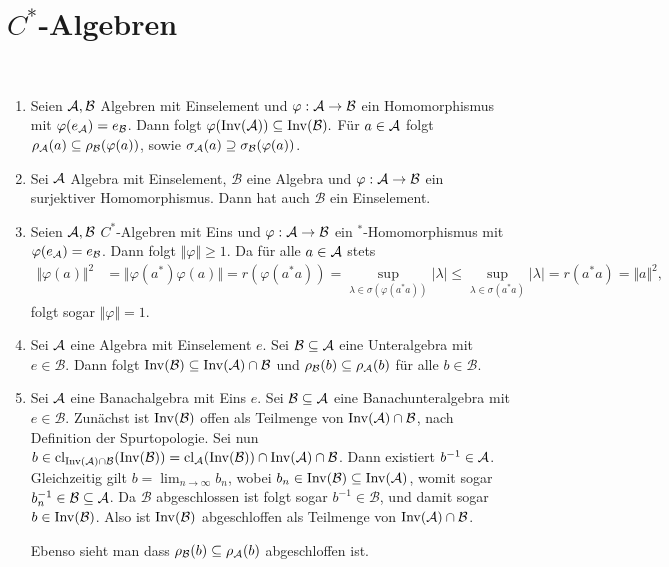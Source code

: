\chapter{\texorpdfstring{$C^*$}{C*}-Algebren}

\begin{remark} \label{rem:eigenschaften-geschachtelter-cstern-algebren} {\ }
    \begin{enumerate}
        \item Seien $\mathcal{A}, \mathcal{B}$ Algebren mit Einselement und $\varphi : \mathcal{A} \to \mathcal{B}$ ein Homomorphismus mit $\varphi(e_{\mathcal{A}}) = e_{\mathcal{B}}$. Dann folgt $\varphi(\operatorname*{Inv}(\mathcal{A})) \subseteq \operatorname*{Inv}(\mathcal{B}).$ Für $a \in \mathcal{A}$ folgt $\rho_{\mathcal{A}}(a) \subseteq \rho_{\mathcal{B}}(\varphi(a))$, sowie $\sigma_{\mathcal{A}}(a) \supseteq \sigma_{\mathcal{B}}(\varphi(a))$.
        
        \item Sei $\mathcal{A}$ Algebra mit Einselement, $\mathcal{B}$ eine Algebra und $\varphi : \mathcal{A} \to \mathcal{B}$ ein surjektiver Homomorphismus. Dann hat auch $\mathcal{B}$ ein Einselement.
        
        \item Seien $\mathcal{A}, \mathcal{B}$ $C^*$-Algebren mit Eins und $\varphi : \mathcal{A} \to \mathcal{B}$ ein ${}^*$-Homo\-morphismus mit $\varphi(e_{\mathcal{A}}) = e_{\mathcal{B}}$. Dann folgt $\Vert \varphi \Vert \geq 1$. Da für alle $a \in \mathcal{A}$ stets
        \begin{align*}
            \Vert \varphi(a) \Vert^2 &= \Vert \varphi(a^*) \varphi(a) \Vert = r(\varphi(a^* a)) = \sup_{\lambda \in \sigma(\varphi(a^* a))} \vert \lambda \vert \leq \sup_{\lambda \in \sigma(a^* a)} \vert \lambda \vert = r(a^* a) = \Vert a \Vert^2,
        \end{align*}
        folgt sogar $\Vert \varphi \Vert = 1$.

        \item Sei $\mathcal{A}$ eine Algebra mit Einselement $e$. Sei $\mathcal{B} \subseteq \mathcal{A}$ eine Unteralgebra mit $e \in \mathcal{B}$. Dann folgt $ \operatorname*{Inv}(\mathcal{B}) \subseteq \operatorname*{Inv}(\mathcal{A}) \cap \mathcal{B} $ und $\rho_{\mathcal{B}}(b) \subseteq \rho_{\mathcal{A}}(b) $ für alle $b \in \mathcal{B}$.
        
        \item Sei $\mathcal{A}$ eine Banachalgebra mit Eins $e$. Sei $\mathcal{B} \subseteq \mathcal{A}$ eine Banachunteralgebra mit $e \in \mathcal{B}$. Zunächst ist $\operatorname*{Inv}(\mathcal{B})$ offen als Teilmenge von $\operatorname*{Inv}(\mathcal{A}) \cap \mathcal{B}$, nach Definition der Spurtopologie. Sei nun $b \in \mathrm{cl}_{\operatorname*{Inv}(\mathcal{A}) \cap \mathcal{B}}(\operatorname*{Inv}(\mathcal{B})) = \mathrm{cl}_{\mathcal{A}}(\operatorname*{Inv}(\mathcal{B})) \cap \operatorname*{Inv}(\mathcal{A}) \cap \mathcal{B}$. Dann existiert $b^{-1} \in \mathcal{A}$. Gleichzeitig gilt $b = \lim_{n \to \infty} b_n$, wobei $b_n \in \operatorname*{Inv}(\mathcal{B}) \subseteq \operatorname*{Inv}(\mathcal{A})$, womit sogar $b_n^{-1} \in \mathcal{B} \subseteq \mathcal{A}$. Da $\mathcal{B}$ abgeschlossen ist folgt sogar $b^{-1} \in \mathcal{B}$, und damit sogar $b \in \operatorname*{Inv}(\mathcal{B})$. Also ist $\operatorname*{Inv}(\mathcal{B})$ abgeschloffen als Teilmenge von $\operatorname*{Inv}(\mathcal{A}) \cap \mathcal{B}$.
        
        Ebenso sieht man dass $\rho_{\mathcal{B}}(b) \subseteq \rho_{\mathcal{A}}(b) $ abgeschloffen ist.
    \end{enumerate}
\end{remark}

